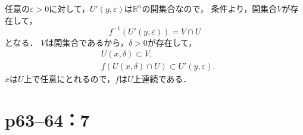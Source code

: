 \begin{tproof}
\begin{enumerate}[(I)]
              任意の$\varepsilon >0$に対して，$U'(y,\varepsilon)$は$\mathbb{R}^n$の開集合なので，
              条件より，開集合$V$が存在して，
              \[
                  f^{-1} (U'(y,\varepsilon)) = V \cap U
              \]
              となる．
              $V$は開集合であるから，$\delta >0$が存在して，
              \begin{align*}
                   & U(x,\delta)  \subset V,                          \\
                   & f(U(x,\delta) \cap U) \subset U'(y,\varepsilon).
              \end{align*}
              $x$は$U$上で任意にとれるので，$f$は$U$上連続である．
    \end{enumerate}
\end{tproof}

\section*{p63--64：7}

